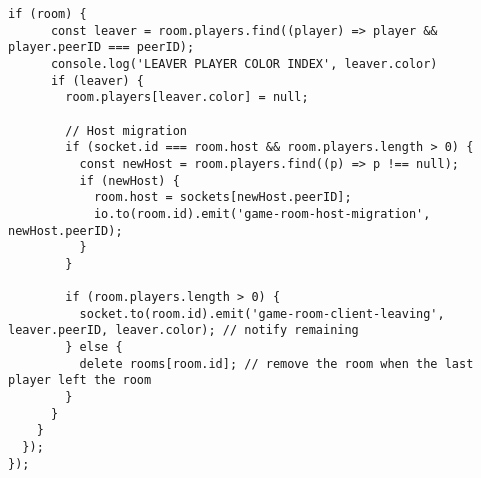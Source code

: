 \begin{singlespace}
\begin{lstlisting}[]
    if (room) {
      const leaver = room.players.find((player) => player && player.peerID === peerID);
      console.log('LEAVER PLAYER COLOR INDEX', leaver.color)
      if (leaver) {
        room.players[leaver.color] = null;

        // Host migration
        if (socket.id === room.host && room.players.length > 0) {
          const newHost = room.players.find((p) => p !== null);
          if (newHost) {
            room.host = sockets[newHost.peerID];
            io.to(room.id).emit('game-room-host-migration', newHost.peerID);
          }
        }

        if (room.players.length > 0) {
          socket.to(room.id).emit('game-room-client-leaving', leaver.peerID, leaver.color); // notify remaining
        } else {
          delete rooms[room.id]; // remove the room when the last player left the room
        }
      }
    }
  });
});
\end{lstlisting}
\end{singlespace}


